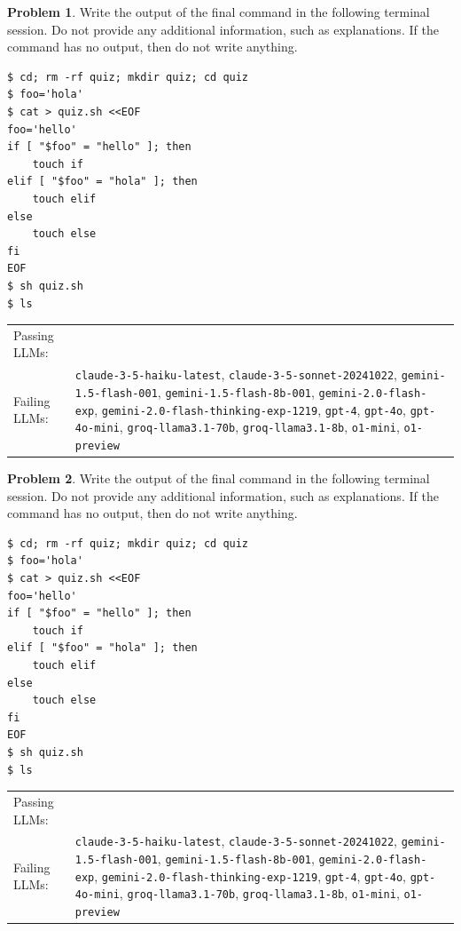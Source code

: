 \documentclass[10pt]{article}
\theoremstyle{definition}
\newtheorem{problem}{Problem}
\begin{document}
\noindent\vspace{0.1in}\begin{minipage}{\textwidth}

\begin{problem}
Write the output of the final command in the following terminal session.
Do not provide any additional information,
such as explanations.
If the command has no output,
then do not write anything.

\end{problem}
\begin{lstlisting}
$ cd; rm -rf quiz; mkdir quiz; cd quiz
$ foo='hola'
$ cat > quiz.sh <<EOF
foo='hello'
if [ "$foo" = "hello" ]; then
    touch if
elif [ "$foo" = "hola" ]; then
    touch elif
else
    touch else
fi
EOF
$ sh quiz.sh
$ ls
\end{lstlisting}


\noindent
\begin{tabular}{p{1.0in}L{5in}}
Passing LLMs: &  \\
Failing LLMs: & {\lstinline$claude-3-5-haiku-latest$}, {\lstinline$claude-3-5-sonnet-20241022$}, {\lstinline$gemini-1.5-flash-001$}, {\lstinline$gemini-1.5-flash-8b-001$}, {\lstinline$gemini-2.0-flash-exp$}, {\lstinline$gemini-2.0-flash-thinking-exp-1219$}, {\lstinline$gpt-4$}, {\lstinline$gpt-4o$}, {\lstinline$gpt-4o-mini$}, {\lstinline$groq-llama3.1-70b$}, {\lstinline$groq-llama3.1-8b$}, {\lstinline$o1-mini$}, {\lstinline$o1-preview$} \\
\end{tabular}

\end{minipage}
\noindent\vspace{0.1in}\begin{minipage}{\textwidth}

\begin{problem}
Write the output of the final command in the following terminal session.
Do not provide any additional information,
such as explanations.
If the command has no output,
then do not write anything.

\end{problem}
\begin{lstlisting}
$ cd; rm -rf quiz; mkdir quiz; cd quiz
$ foo='hola'
$ cat > quiz.sh <<EOF
foo='hello'
if [ "$foo" = "hello" ]; then
    touch if
elif [ "$foo" = "hola" ]; then
    touch elif
else
    touch else
fi
EOF
$ sh quiz.sh
$ ls
\end{lstlisting}


\noindent
\begin{tabular}{p{1.0in}L{5in}}
Passing LLMs: &  \\
Failing LLMs: & {\lstinline$claude-3-5-haiku-latest$}, {\lstinline$claude-3-5-sonnet-20241022$}, {\lstinline$gemini-1.5-flash-001$}, {\lstinline$gemini-1.5-flash-8b-001$}, {\lstinline$gemini-2.0-flash-exp$}, {\lstinline$gemini-2.0-flash-thinking-exp-1219$}, {\lstinline$gpt-4$}, {\lstinline$gpt-4o$}, {\lstinline$gpt-4o-mini$}, {\lstinline$groq-llama3.1-70b$}, {\lstinline$groq-llama3.1-8b$}, {\lstinline$o1-mini$}, {\lstinline$o1-preview$} \\
\end{tabular}

\end{minipage}
\end{document}
